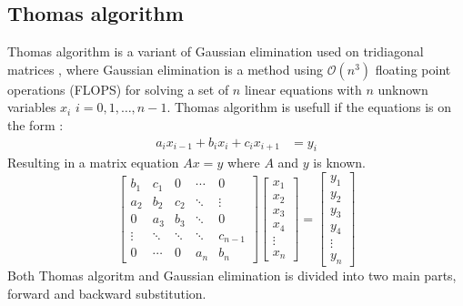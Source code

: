 \documentclass[twoside,twocolumn]{article}
\begin{document}
\subsection{Thomas algorithm}
Thomas algorithm is a variant of Gaussian elimination used on tridiagonal matrices \cite{compfys}, where Gaussian elimination is a method using $\mathcal{O}(n^3)$ floating point operations (FLOPS) for solving a set of $n$ linear equations with $n$ unknown variables $x_i$ $i=0,1,\ldots,n-1$. Thomas algorithm is usefull if the equations is on the form :
\begin{align*}
a_{i}x_{i-1}+b_{i}x_i+c_{i}x_{i+1}&=y_i
\end{align*}
Resulting in a matrix equation $Ax= y$ where $A$ and $y$ is known.
\begin{equation*}
\begin{bmatrix}
b_1&c_1&0&\cdots &0\\
a_2&b_2&c_2& \ddots & \vdots\\
0&a_3&b_3&\ddots&0\\
\vdots&\ddots&\ddots&\ddots&c_{n-1}\\
0&\cdots&0&a_n&b_n
\end{bmatrix}
\begin{bmatrix}
x_1\\x_2\\x_3\\x_4\\\vdots\\x_{n}
\end{bmatrix}=
\begin{bmatrix}
y_1\\y_2\\y_3\\y_4\\\vdots\\y_{n}
\end{bmatrix} 
\end{equation*}
Both Thomas algoritm and Gaussian elimination is divided into two main parts, forward and backward substitution.
\end{document}
